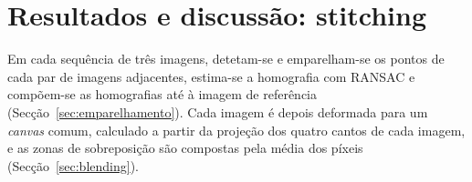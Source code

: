 \documentclass[11pt,a4paper]{article}
\newcommand{\px}{\,px}
\begin{document}
\section{Resultados e discussão: stitching} 



Em cada sequência de três imagens, detetam-se e emparelham-se os pontos de cada par de imagens adjacentes, estima-se a homografia com RANSAC e compõem-se as homografias até à imagem de referência (Secção~\ref{sec:emparelhamento}). Cada imagem é depois deformada para um \textit{canvas} comum, calculado a partir da projeção dos quatro cantos de cada imagem, e as zonas de sobreposição são
compostas pela média dos píxeis (Secção~\ref{sec:blending}).
\end{document}
